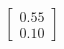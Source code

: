 \documentclass[preview]{standalone}
\begin{document}
\begin{align*}
\begin{bmatrix} 0.55 \\ 0.10 \end{bmatrix}
\end{align*}
\end{document}

